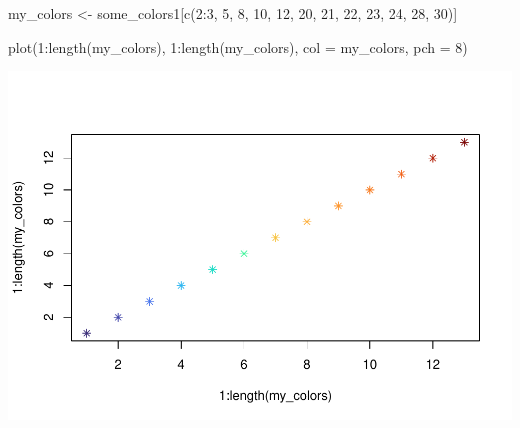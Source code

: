 \documentclass[
  11pt,
]{article}
\newenvironment{Shaded}{\begin{snugshade}}{\end{snugshade}}
\newcommand{\AttributeTok}[1]{\textcolor[rgb]{0.77,0.63,0.00}{#1}}
\newcommand{\DecValTok}[1]{\textcolor[rgb]{0.00,0.00,0.81}{#1}}
\newcommand{\FunctionTok}[1]{\textcolor[rgb]{0.00,0.00,0.00}{#1}}
\newcommand{\NormalTok}[1]{#1}
\newcommand{\OtherTok}[1]{\textcolor[rgb]{0.56,0.35,0.01}{#1}}
\newcommand{\SpecialCharTok}[1]{\textcolor[rgb]{0.00,0.00,0.00}{#1}}
\begin{document}
\begin{Shaded}
\begin{Highlighting}[]
\NormalTok{my\_colors }\OtherTok{\textless{}{-}}\NormalTok{ some\_colors1[}\FunctionTok{c}\NormalTok{(}\DecValTok{2}\SpecialCharTok{:}\DecValTok{3}\NormalTok{, }\DecValTok{5}\NormalTok{,}
                           \DecValTok{8}\NormalTok{, }\DecValTok{10}\NormalTok{, }\DecValTok{12}\NormalTok{,}
                           \DecValTok{20}\NormalTok{, }\DecValTok{21}\NormalTok{, }\DecValTok{22}\NormalTok{, }\DecValTok{23}\NormalTok{, }\DecValTok{24}\NormalTok{,}
                           \DecValTok{28}\NormalTok{, }\DecValTok{30}\NormalTok{)]}

\FunctionTok{plot}\NormalTok{(}\DecValTok{1}\SpecialCharTok{:}\FunctionTok{length}\NormalTok{(my\_colors), }
     \DecValTok{1}\SpecialCharTok{:}\FunctionTok{length}\NormalTok{(my\_colors), }
     \AttributeTok{col =}\NormalTok{ my\_colors, }\AttributeTok{pch =} \DecValTok{8}\NormalTok{)}
\end{Highlighting}
\end{Shaded}

\includegraphics{Supp_Info_1_files/figure-latex/unnamed-chunk-5-1.pdf}
\end{document}
